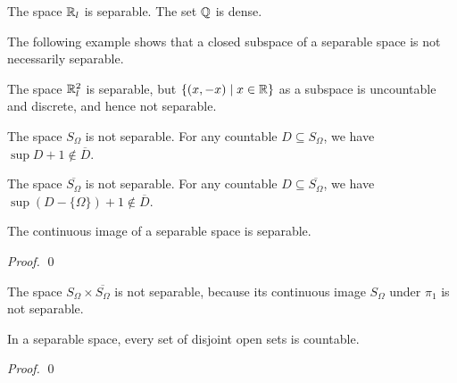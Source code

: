 \begin{example}
    The space $\mathbb{R}_l$ is separable. The set $\mathbb{Q}$ is dense.
\end{example}

The following example shows that a closed subspace of a separable space is not
necessarily separable.
\begin{example}[AC]
    The space $\mathbb{R}_l^2$ is separable, but $\{ (x, -x) \mid x \in \mathbb{R} \}$ as a
    subspace is uncountable and discrete, and hence not separable.
\end{example}

\begin{example}
    The space $S_\Omega$ is not separable. For any countable $D \subseteq S_\Omega$,
    we have $\sup D + 1 \notin \overline{D}$.
\end{example}

\begin{example}    
    The space $\overline{S_\Omega}$ is not separable. For any countable $D
    \subseteq \overline{S_\Omega}$, we have $\sup (D - \{ \Omega \}) + 1 \notin
    \overline{D}$.
\end{example}

\begin{proposition}
    The continuous image of a separable space is separable.
\end{proposition}

\begin{proof}
    \pf
    \qed
\end{proof}

\begin{example}
    The space $S_\Omega \times \overline{S_\Omega}$ is not separable, because its continuous image $S_\Omega$
    under $\pi_1$ is not separable.
\end{example}

\begin{proposition}[Choice]
    In a separable space, every set of disjoint open sets is countable.
\end{proposition}

\begin{proof}
    \pf
    \qed
\end{proof}

